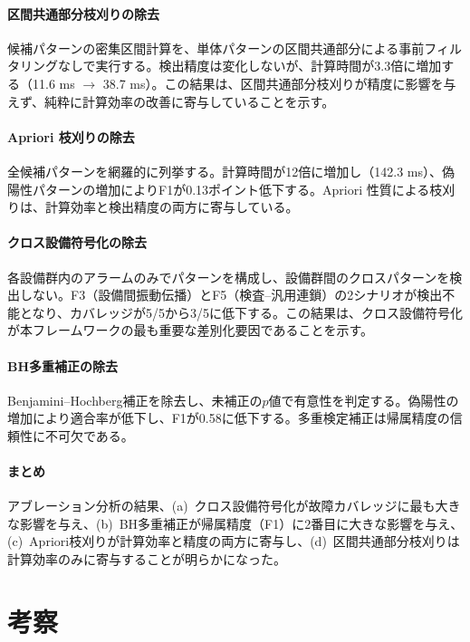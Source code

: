 \documentclass[11pt]{article}
\begin{document}
\paragraph{区間共通部分枝刈りの除去}
候補パターンの密集区間計算を、単体パターンの区間共通部分による事前フィルタリングなしで実行する。検出精度は変化しないが、計算時間が3.3倍に増加する（11.6 ms $\to$ 38.7 ms）。この結果は、区間共通部分枝刈りが精度に影響を与えず、純粋に計算効率の改善に寄与していることを示す。

\paragraph{Apriori 枝刈りの除去}
全候補パターンを網羅的に列挙する。計算時間が12倍に増加し（142.3 ms）、偽陽性パターンの増加によりF1が0.13ポイント低下する。Apriori 性質による枝刈りは、計算効率と検出精度の両方に寄与している。

\paragraph{クロス設備符号化の除去}
各設備群内のアラームのみでパターンを構成し、設備群間のクロスパターンを検出しない。F3（設備間振動伝播）とF5（検査--汎用連鎖）の2シナリオが検出不能となり、カバレッジが5/5から3/5に低下する。この結果は、クロス設備符号化が本フレームワークの最も重要な差別化要因であることを示す。

\paragraph{BH多重補正の除去}
Benjamini--Hochberg補正を除去し、未補正の$p$値で有意性を判定する。偽陽性の増加により適合率が低下し、F1が0.58に低下する。多重検定補正は帰属精度の信頼性に不可欠である。

\paragraph{まとめ}
アブレーション分析の結果、(a)~クロス設備符号化が故障カバレッジに最も大きな影響を与え、(b)~BH多重補正が帰属精度（F1）に2番目に大きな影響を与え、(c)~Apriori枝刈りが計算効率と精度の両方に寄与し、(d)~区間共通部分枝刈りは計算効率のみに寄与することが明らかになった。

\section{考察}\label{sec:discussion}
\end{document}
